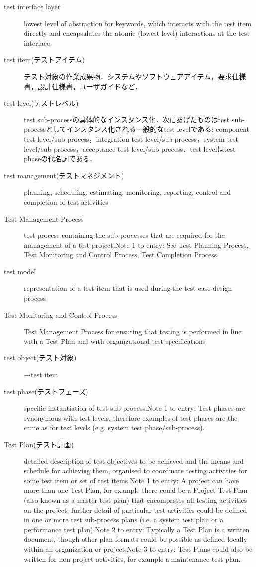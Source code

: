 \begin{description}
    \item[test interface layer]lowest level of abstraction for keywords, which interacts with the test item directly and encapsulates the atomic (lowest level) interactions at the test interface
    \item[test item(テストアイテム)]テスト対象の作業成果物．システムやソフトウェアアイテム，要求仕様書，設計仕様書，ユーザガイドなど．
    \item[test level(テストレベル)] test sub-processの具体的なインスタンス化．次にあげたものはtest sub-processとしてインスタンス化される一般的なtest levelである: component test level/sub-process，integration test level/sub-process，system test level/sub-process，acceptance test level/sub-process．test levelはtest phaseの代名詞である．
    \item[test management(テストマネジメント)]planning, scheduling, estimating, monitoring, reporting, control and completion of test activities
    \item[Test Management Process]test process containing the sub-processes that are required for the management of a test project.Note 1 to entry: See Test Planning Process, Test Monitoring and Control Process, Test Completion Process.
    \item[test model]representation of a test item that is used during the test case design process
    \item[Test Monitoring and Control Process]Test Management Process for ensuring that testing is performed in line with a Test Plan and with organizational test specifications
    \item[test object(テスト対象)]→test item
    \item[test phase(テストフェーズ)]specific instantiation of test sub-process.Note 1 to entry: Test phases are synonymous with test levels, therefore examples of test phases are the same as for test levels (e.g. system test phase/sub-process).
    \item[Test Plan(テスト計画)]detailed description of test objectives to be achieved and the means and schedule for achieving them, organised to coordinate testing activities for some test item or set of test items.Note 1 to entry: A project can have more than one Test Plan, for example there could be a Project Test Plan (also known as a master test plan) that encompasses all testing activities on the project; further detail of particular test activities could be defined in one or more test sub-process plans (i.e. a system test plan or a performance test plan).Note 2 to entry: Typically a Test Plan is a written document, though other plan formats could be possible as defined locally within an organization or project.Note 3 to entry: Test Plans could also be written for non-project activities, for example a maintenance test plan.

\end{description}
